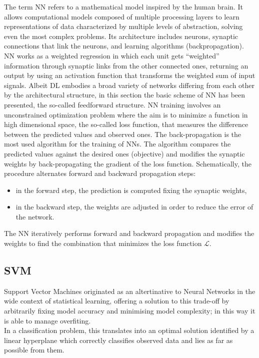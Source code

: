 \documentclass[a4,12pt]{article}
\begin{document}
The term NN refers to a mathematical model inspired by the human brain. It allows computational models composed of multiple processing layers to learn representations of data characterized by multiple levels of abstraction, solving even the most complex problems. Its architecture includes neurons, synaptic connections that link the neurons, and learning algorithms (backpropagation). NN works as a weighted regression in which each unit gets “weighted” information through synaptic links from the other connected ones, returning an output by using an activation function that transforms the weighted sum of input signals. Albeit DL embodies a broad variety of networks differing from each other by the architectural structure, in this section the basic scheme of NN has been presented, the so-called feedforward structure.
NN training involves an unconstrained optimization problem where the aim is to minimize a
function in high dimensional space, the so-called loss function, that measures the difference between the predicted values and observed ones.
The back-propagation is the most used algorithm for the training of NNs. The algorithm compares the predicted values against the desired ones (objective)
and modifies the synaptic weights by back-propagating the gradient of the loss function. Schematically,
the procedure alternates forward and backward propagation steps:
\begin{itemize}
\item in the forward step, the prediction is computed fixing the synaptic weights,
\item in the backward step, the weights are adjusted in order to reduce the error of the network.
\end{itemize}
The NN iteratively performs forward and backward propagation and modifies the weights to
find the combination that minimizes the loss function $\mathcal{L}$.

\subsection{SVM}

Support Vector Machines originated as an altertinative to Neural Networks in the wide context of statistical learning, offering a solution to this trade-off by arbitrarily fixing model accuracy and minimising model complexity; in this way it is able to manage overfiting.\\ 
In a classification problem, this translates into an optimal solution identified by a linear hyperplane which correctly classifies observed data and lies as far as possible from them.\\
\end{document}
